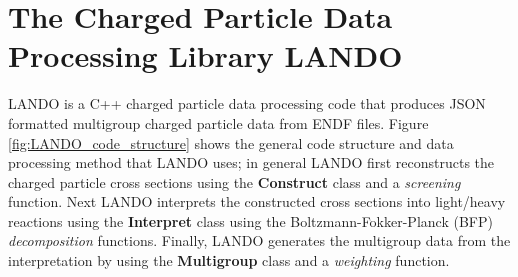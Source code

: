 \documentclass[../main.tex]{subfiles}
\begin{document}
\chapter{The Charged Particle Data Processing Library LANDO}
LANDO is a C++ charged particle data processing code that produces JSON formatted multigroup charged particle data from ENDF files. Figure \ref{fig:LANDO_code_structure} shows the general code structure and data processing method that LANDO uses; in general LANDO first reconstructs the charged particle cross sections using the \textbf{Construct} class and a \textit{screening} function. Next LANDO interprets the constructed cross sections into light/heavy reactions using the \textbf{Interpret} class using the Boltzmann-Fokker-Planck (BFP) \textit{decomposition} functions. Finally, LANDO generates the multigroup data from the interpretation by using the \textbf{Multigroup} class and a \textit{weighting} function.
\end{document}
